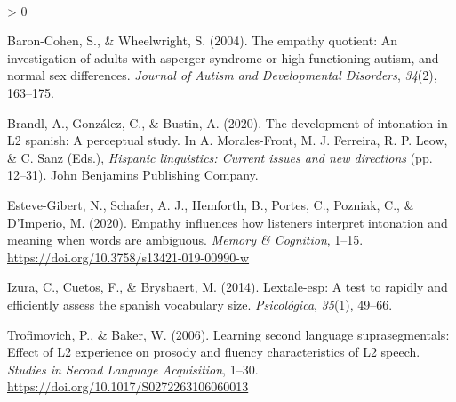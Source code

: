 \documentclass[
  12pt,
]{article}
\newlength{\cslhangindent}
\newenvironment{CSLReferences}[2] %
 {%
  \setlength{\parindent}{0pt}
  \ifodd #1 \everypar{\setlength{\hangindent}{\cslhangindent}}\ignorespaces\fi
  \ifnum #2 > 0
  \setlength{\parskip}{#2\baselineskip}
  \fi
 }%
 {}
\begin{document}
\begingroup
\setlength{\parindent}{-0.5in}
\setlength{\leftskip}{0.5in}

\phantom{.}

\textcolor{white}{\\} \vspace{-0.5in}

\hypertarget{refs}{}
\begin{CSLReferences}{1}{0}
\leavevmode\hypertarget{ref-baron2004empathy}{}%
Baron-Cohen, S., \& Wheelwright, S. (2004). The empathy quotient: An
investigation of adults with asperger syndrome or high functioning
autism, and normal sex differences. \emph{Journal of Autism and
Developmental Disorders}, \emph{34}(2), 163--175.

\leavevmode\hypertarget{ref-bustin_2020}{}%
Brandl, A., González, C., \& Bustin, A. (2020). The development of
intonation in L2 spanish: A perceptual study. In A. Morales-Front, M. J.
Ferreira, R. P. Leow, \& C. Sanz (Eds.), \emph{Hispanic linguistics:
Current issues and new directions} (pp. 12--31). John Benjamins
Publishing Company.

\leavevmode\hypertarget{ref-esteve2020empathy}{}%
Esteve-Gibert, N., Schafer, A. J., Hemforth, B., Portes, C., Pozniak,
C., \& D'Imperio, M. (2020). Empathy influences how listeners interpret
intonation and meaning when words are ambiguous. \emph{Memory \&
Cognition}, 1--15. \url{https://doi.org/10.3758/s13421-019-00990-w}

\leavevmode\hypertarget{ref-izura2014lextale}{}%
Izura, C., Cuetos, F., \& Brysbaert, M. (2014). Lextale-esp: A test to
rapidly and efficiently assess the spanish vocabulary size.
\emph{Psicol{ó}gica}, \emph{35}(1), 49--66.

\leavevmode\hypertarget{ref-trofimovich2006learning}{}%
Trofimovich, P., \& Baker, W. (2006). Learning second language
suprasegmentals: Effect of L2 experience on prosody and fluency
characteristics of L2 speech. \emph{Studies in Second Language
Acquisition}, 1--30. \url{https://doi.org/10.1017/S0272263106060013}

\end{CSLReferences}

\endgroup
\end{document}
